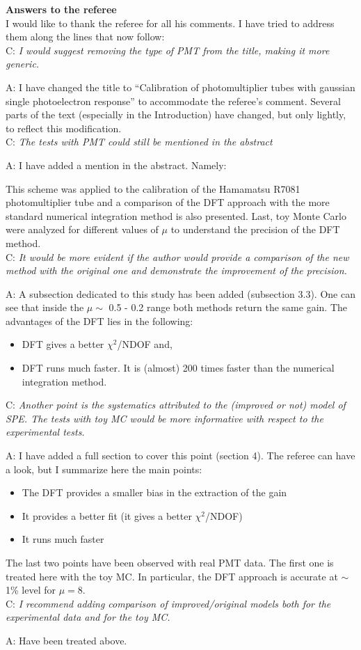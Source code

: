 \documentclass[a4paper,11pt]{article}
\begin{document}
{\bf Answers to the referee}
\\[1ex]

I would like to thank the referee for all his comments. 
I have tried to address them along the lines that now follow:
\\[1ex]

C: \emph{ I would suggest removing the type of PMT from the title, making it more generic. } 
	
A: I have changed the title to ``Calibration of photomultiplier tubes with gaussian single photoelectron response'' 
to accommodate the referee's comment.
Several parts of the text (especially in the Introduction) have changed, but only lightly, to reflect this modification. 
\\[1ex]

C: \emph{The tests with PMT could still be mentioned in the abstract} 

A: I have added a mention in the abstract. Namely: 

This scheme was applied to the calibration of the Hamamatsu R7081 photomultiplier tube and a comparison of the DFT approach with the more standard numerical integration method is also presented.
Last, toy Monte Carlo were analyzed for different values of $\mu$ to understand the precision of the DFT method.
\\[1ex]

C: \emph{ It would be more evident if the author would provide a comparison of the new method with the original one and demonstrate the improvement of the precision. }
	
A: A subsection dedicated to this study has been added (subsection 3.3). 
One can see that inside the $\mu\sim$ 0.5 - 0.2 range both methods return the same gain. 
The advantages of the DFT lies in the following:
\begin{itemize}
\item DFT gives a better $\chi^2$/NDOF and, 
\item DFT runs much faster. 
It is (almost) 200 times faster than the numerical integration method. 
\end{itemize}


C: \emph{Another point is the systematics attributed to the (improved or not) model of SPE. 
The tests with toy MC would be more informative with respect to the experimental tests.}

A: I have added a full section to cover this point (section 4). The referee can have a look, but I summarize here the main points: 
\begin{itemize}
\item The DFT provides a smaller bias in the extraction of the gain
\item It provides a better fit (it gives a better $\chi^2$/NDOF)
\item It runs much faster 
\end{itemize}
The last two points have been observed with real PMT data. 
The first one is treated here with the toy MC. 
In particular, the DFT approach is accurate at $\sim$ 1\% level for $\mu=8$. 
\\[1ex]

C: \emph{I recommend adding comparison of improved/original models both for the experimental data and for the toy MC.}

A: Have been treated above.
\end{document}

